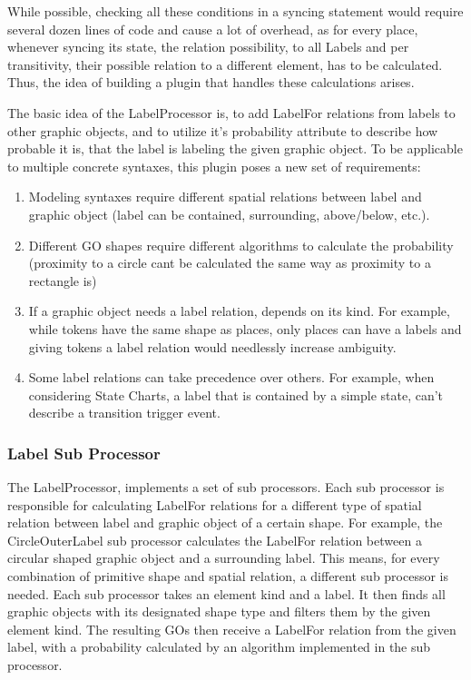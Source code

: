 While possible, checking all these conditions in a syncing statement would require several dozen lines of code and cause a lot of overhead, as for every place, whenever syncing its state, the relation possibility, to all Labels and per transitivity, their possible relation to a different element, has to be calculated. Thus, the idea of building a plugin that handles these calculations arises.

The basic idea of the LabelProcessor is, to add LabelFor relations from labels to other graphic objects, and to utilize it's probability attribute to describe how probable it is, that the label is labeling the given graphic object. To be applicable to multiple concrete syntaxes, this plugin poses a new set of requirements: 
\begin{enumerate}
  \item Modeling syntaxes require different spatial relations between label and graphic object (label can be contained, surrounding, above/below, etc.).
  \item Different GO shapes require different algorithms to calculate the probability (proximity to a circle cant be calculated the same way as proximity to a rectangle is)
  \item If a graphic object needs a label relation, depends on its kind. For example, while tokens have the same shape as places, only places can have a labels and giving tokens a label relation would needlessly increase ambiguity.
  \item Some label relations can take precedence over others. For example, when considering State Charts, a label that is contained by a simple state, can't describe a transition trigger event.
\end{enumerate}

\subsubsection{Label Sub Processor}
The LabelProcessor, implements a set of sub processors. Each sub processor is responsible for calculating LabelFor relations for a different type of spatial relation between label and  graphic object of a certain shape. For example, the CircleOuterLabel sub processor calculates the LabelFor relation between a circular shaped graphic object and a surrounding label. This means, for every combination of primitive shape and spatial relation, a different sub processor is needed. Each sub processor takes an element kind and a label. It then finds all graphic objects with its designated shape type and filters them by the given element kind. The resulting GOs then receive a LabelFor relation from the given label, with a probability calculated by an algorithm implemented in the sub processor. 

